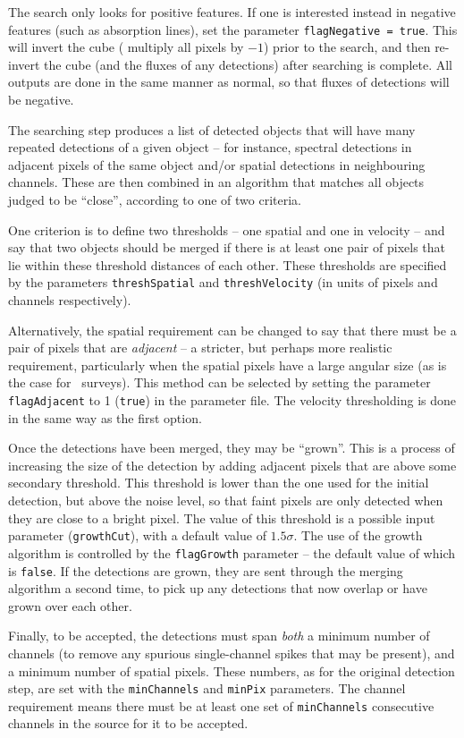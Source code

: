 The search only looks for positive features. If one is interested
instead in negative features (such as absorption lines), set the
parameter \texttt{flagNegative = true}. This will invert the cube (\ie
multiply all pixels by $-1$) prior to the search, and then re-invert
the cube (and the fluxes of any detections) after searching is
complete. All outputs are done in the same manner as normal, so that
fluxes of detections will be negative.

\label{sec-merger}

The searching step produces a list of detected objects that will have
many repeated detections of a given object -- for instance, spectral
detections in adjacent pixels of the same object and/or spatial
detections in neighbouring channels. These are then combined in an
algorithm that matches all objects judged to be ``close'', according
to one of two criteria.

One criterion is to define two thresholds -- one spatial and one in
velocity -- and say that two objects should be merged if there is at
least one pair of pixels that lie within these threshold distances of
each other. These thresholds are specified by the parameters
\texttt{threshSpatial} and \texttt{threshVelocity} (in units of pixels
and channels respectively).

Alternatively, the spatial requirement can be changed to say that
there must be a pair of pixels that are \emph{adjacent} -- a stricter,
but perhaps more realistic requirement, particularly when the spatial
pixels have a large angular size (as is the case for \hi\
surveys). This method can be selected by setting the parameter
\texttt{flagAdjacent} to 1 (\ie \texttt{true}) in the parameter
file. The velocity thresholding is done in the same way as the first
option.

Once the detections have been merged, they may be ``grown''. This is a
process of increasing the size of the detection by adding adjacent
pixels that are above some secondary threshold. This threshold is
lower than the one used for the initial detection, but above the noise
level, so that faint pixels are only detected when they are close to a
bright pixel. The value of this threshold is a possible input
parameter (\texttt{growthCut}), with a default value of
$1.5\sigma$. The use of the growth algorithm is controlled by the
\texttt{flagGrowth} parameter -- the default value of which is
\texttt{false}. If the detections are grown, they are sent through the
merging algorithm a second time, to pick up any detections that now
overlap or have grown over each other.

Finally, to be accepted, the detections must span \emph{both} a
minimum number of channels (to remove any spurious single-channel
spikes that may be present), and a minimum number of spatial
pixels. These numbers, as for the original detection step, are set
with the \texttt{minChannels} and \texttt{minPix} parameters. The
channel requirement means there must be at least one set of
\texttt{minChannels} consecutive channels in the source for it to be
accepted.
